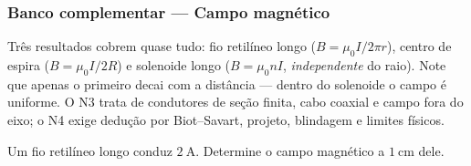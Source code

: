 
\subsubsection*{Banco complementar --- Campo magnético}

\begin{atencao}
Três resultados cobrem quase tudo: fio retilíneo longo
($B=\mu_0I/2\pi r$), centro de espira ($B=\mu_0I/2R$) e solenoide longo
($B=\mu_0nI$, \emph{independente} do raio). Note que apenas o primeiro decai com
a distância --- dentro do solenoide o campo é uniforme. O N3 trata de condutores
de seção finita, cabo coaxial e campo fora do eixo; o N4 exige dedução por
Biot--Savart, projeto, blindagem e limites físicos.
\end{atencao}

\blocofixacao

\begin{questao}[1]{}
Um fio retilíneo longo conduz $\SI{2}{\ampere}$. Determine o campo magnético a
$\SI{1}{\centi\meter}$ dele.
\end{questao}

